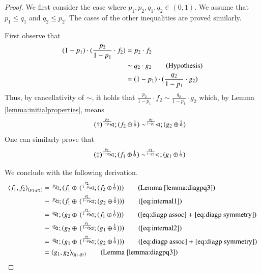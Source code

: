 \begin{proof}\label{proof-lemma: convex products quoziente}%
We first consider the case where $p_1,p_2,q_1,q_2\in(0,1)$. We assume that $p_1\leq q_1$  and $q_2\leq p_2$.  The cases of the other inequalities are proved similarly.

First observe that
\begin{align*}
(1-p_1)\cdot (\frac{p_2}{1-p_1}\cdot f_2) &= p_2\cdot f_2 \notag \\
& \sim q_2\cdot g_2 \tag{Hypothesis}\\
&= (1-p_1)\cdot (\frac{q_2}{1-p_1}\cdot g_2) \notag
\end{align*}
Thus, by cancellativity of $\sim$, it holds that $\frac{p_2}{1-p_1}\cdot f_2 \sim \frac{q_2}{1-p_1}\cdot g_2$ which, by Lemma \ref{lemma:initialproperties}, means
\begin{equation}\tag{$\dagger$}\label{eq:internal1}
\diagpX{\frac{p_2}{1-p_1}\,}{};(f_2\piu\, \bangp{}) \sim \diagpX{\frac{q_2}{1-p_1}\,}{};(g_2\piu\, \bangp{}) 
\end{equation}
One can similarly prove that 
\begin{equation}\tag{$\ddagger$}\label{eq:internal2}
\diagpX{\frac{p_1}{1-q_2}\,}{};(f_1\piu\, \bangp{}) \sim \diagpX{\frac{q_1}{1-q_2}\,}{};(g_1\piu\, \bangp{}) 
\end{equation}

We conclude with the following derivation. %
  \begin{align*}
        \langle f_1,f_2\rangle_{(p_1,p_2)}&=\, \diagpX{p_1}{}; (f_1\piu\, (\diagpX{\frac{p_2}{1-p_1}\,}{};(f_2\piu\, \bangp{})) ) \tag{Lemma~\ref{lemma:diagpq3}}\\
        &\sim \, \diagpX{p_1}{}; (f_1\piu\, (\diagpX{\frac{q_2}{1-p_1}\,}{};(g_2\piu\, \bangp{})) ) \tag{\eqref{eq:internal1}}\\
& = \, \diagpX{q_2}{};(g_2\piu\, (\diagpX{\frac{p_1}{1-q_2}\,}{};(f_1\piu\, \bangp{})) ) \tag{\ref{eq:diagp assoc} + \ref{eq:diagp symmetry}}  \\
&\sim \, \diagpX{q_2}{};(g_2\piu\, (\diagpX{\frac{q_1}{1-q_2}\,}{};(g_1\piu\, \bangp{})) ) \tag{\eqref{eq:internal2}}\\
 &=\,  \diagpX{q_1}{}; (g_1\piu\, (\diagpX{\frac{q_2}{1-q_1}\,}{};(g_2\piu\, \bangp{})) ) \tag{\ref{eq:diagp assoc} + \ref{eq:diagp symmetry}}\\
 &=  \langle g_1,g_2\rangle_{(q_1,q_2)}  \tag{Lemma~\ref{lemma:diagpq3}}
  \end{align*}
  

\end{proof}
